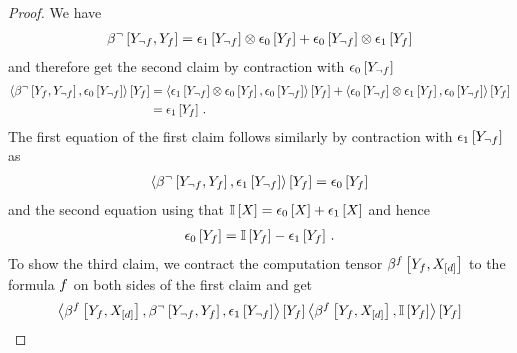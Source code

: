 \begin{proof}
    We have
    \begin{align*}
        \beta^{\lnot}\left[Y_{\lnot f},Y_{f}\right]
        = \epsilon_1\left[Y_{\lnot f}\right] \otimes \epsilon_0\left[Y_{f}\right]
        +\epsilon_0\left[Y_{\lnot f}\right] \otimes \epsilon_1\left[Y_{f}\right]
    \end{align*}
    and therefore get the second claim by contraction with $\epsilon_0\left[Y_{\lnot f}\right]$
    \begin{align*}
        \left\langle 
            \beta^{\lnot}\left[Y_{f},Y_{\lnot f}\right],\epsilon_0\left[Y_{\lnot f}\right]
        \right\rangle \left[ Y_{f} \right]
        &=  \left\langle 
            \epsilon_1\left[Y_{\lnot f}\right] \otimes \epsilon_0\left[Y_{f}\right],\epsilon_0\left[Y_{\lnot f}\right]
        \right\rangle \left[ Y_{f} \right]
        +  \left\langle 
            \epsilon_0\left[Y_{\lnot f}\right] \otimes \epsilon_1\left[Y_{f}\right],\epsilon_0\left[Y_{\lnot f}\right]
        \right\rangle \left[ Y_{f} \right]
        \\
        &= \epsilon_1\left[Y_{f}\right] \, .
    \end{align*}
    The first equation of the first claim follows similarly by contraction with $\epsilon_1\left[Y_{\lnot f}\right]$ as
    \begin{align*}
        \left\langle 
            \beta^{\lnot}\left[Y_{\lnot f},Y_{f}\right],\epsilon_1\left[Y_{\lnot f}\right]
        \right\rangle \left[ Y_{f} \right]
        = \epsilon_0\left[Y_{f}\right]
    \end{align*}
    and the second equation using that $\mathbb{I}\left[X\right]=\epsilon_0\left[X\right]+\epsilon_1\left[X\right]$ and hence
    \begin{align*}
        \epsilon_0\left[Y_{f}\right] =  \mathbb{I}\left[Y_{f}\right] - \epsilon_1\left[Y_{f}\right] \, .
    \end{align*}
    To show the third claim, we contract the computation tensor $\beta^{f}\left[Y_{f},X_{[d]}\right]$ to the formula $f$ on both sides of the first claim and get
    \begin{align*}
        \contractionof{
            \bencodingofat{\exformula}{\formulavar,\shortcatvariables},\bencodingofat{\lnot}{\headvariableof{\lnot\exformula},\formulavar},\tbasisat{\headvariableof{\lnot\exformula}}
        }{\formulavar}
        \contractionof{\bencodingofat{\exformula}{\formulavar,\shortcatvariables},\onesat{\formulavar}}{\formulavar}

\end{align*}
\end{proof}
